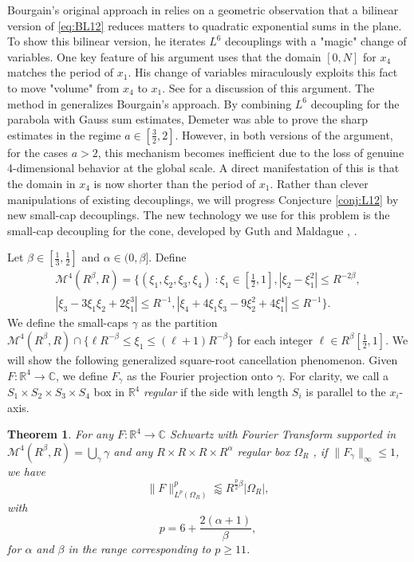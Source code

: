 \documentclass[12pt]{amsart}
\newtheorem{theorem}{Theorem}[section]
\providecommand{\C}{\mathbb C}
\providecommand{\R}{\mathbb R}
\providecommand{\M}{\mathcal{M}}
\begin{document}
Bourgain's original approach in \cite{bourgain2016decouplingexponentialsumsriemann} relies on a geometric observation that a bilinear version of \eqref{eq:BL12} reduces matters to quadratic exponential sums in the plane. To show this bilinear version, he iterates $L^6$ decouplings with a "magic" change of variables. One key feature of his argument uses that the domain $[0,N]$ for $x_4$ matches the period of $x_1$. His change of variables miraculously exploits this fact to move "volume" from $x_4$ to $x_1$. See \cite[Section 3]{demeter2021l12squarerootcancellation} for a discussion of this argument.
%
The method in \cite{demeter2021l12squarerootcancellation} generalizes Bourgain's approach. By combining $L^6$ decoupling for the parabola with Gauss sum estimates, Demeter was able to prove the sharp estimates in the regime $a\in [\frac{3}{2}, 2]$. However, in both versions of the argument, for the cases $a> 2$, this mechanism becomes inefficient due to the loss of genuine 4-dimensional behavior at the global scale. A direct manifestation of this is that the domain in $x_4$ is now shorter than the period of $x_1$.
%
Rather than clever manipulations of existing decouplings, we will progress Conjecture \ref{conj:L12} by new small-cap decouplings. The new technology we use for this problem is the small-cap decoupling for the cone, developed by Guth and Maldague  \cite{maldague2022amplitudedependentwaveenvelope}, \cite{Guth_2024}.



Let $\beta \in [\frac{1}{3}, \frac{1}{2}]$ and $\alpha\in (0, \beta]$. Define \begin{multline*}
    \M^4(R^{\beta}, R) = \big\{(\xi_1, \xi_2, \xi_3, \xi_4) \; : \xi_1 \in [\frac{1}{2}, 1], |\xi_2-\xi_1^2|\le R^{-2\beta},\\ |\xi_3-3\xi_1\xi_2+2\xi_1^3|\le R^{-1}, |\xi_4+4\xi_1\xi_3-9\xi_2^2+4\xi_1^4|\le R^{-1}\big\}.
\end{multline*} We define the small-caps $\gamma$ as the partition $\M^4(R^{\beta}, R)\cap \{\ell R^{-\beta}\le \xi_1\le (\ell+1)R^{-\beta}\}$ for each integer $\ell\in R^{\beta}[\frac{1}{2}, 1]$. We will show the following generalized square-root cancellation phenomenon. Given $F:\R^4\to \C$, we define $F_\gamma$ as the Fourier projection onto $\gamma$. For clarity, we call a $S_1\times S_2\times S_3\times S_4$ box in $\R^4$ \emph{regular} if the side with length $S_i$ is parallel to the $x_i$-axis. 
\begin{theorem} \label{thm:mainResult}
   For any $F:\R^4\to \C$ Schwartz with Fourier Transform supported in $\M^4(R^{\beta}, R)= \bigcup_{\gamma}\gamma$ and any $R\times R\times R\times R^{\alpha}$ regular box $\Omega_R$ , if $\|F_\gamma\|_\infty \le 1$, we have $$\|F\|_{L^{p}(\Omega_R)}^{p}\lessapprox R^{\frac{p}{2}\beta} |\Omega_R|,$$ with $$p= 6+\frac{2(\alpha+1)}{\beta},$$ for $\alpha$ and $\beta$ in the range corresponding to $p\ge 11$.
\end{theorem}
\end{document}
